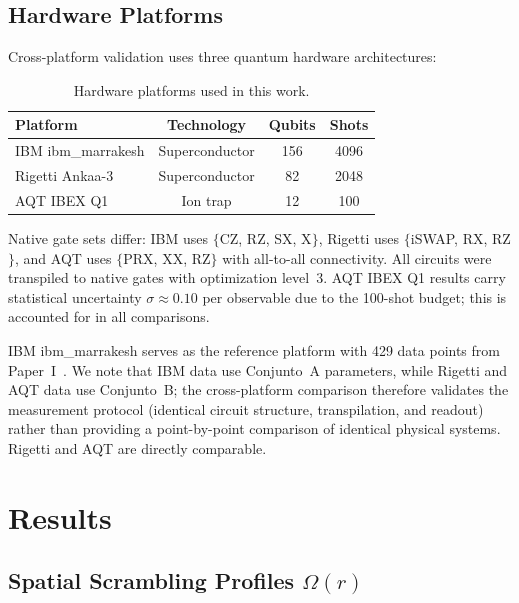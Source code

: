 \documentclass[twocolumn,showpacs,preprintnumbers,amsmath,amssymb,aps,prl]{revtex4-2}
\begin{document}
\subsection{Hardware Platforms}

Cross-platform validation uses three quantum hardware architectures:

\begin{table}[h]
\caption{Hardware platforms used in this work.}
\label{tab:hardware}
\begin{ruledtabular}
\begin{tabular}{lccc}
Platform & Technology & Qubits & Shots \\
\hline
IBM ibm\_marrakesh & Superconductor & 156 & 4096 \\
Rigetti Ankaa-3 & Superconductor & 82 & 2048 \\
AQT IBEX Q1 & Ion trap & 12 & 100 \\
\end{tabular}
\end{ruledtabular}
\end{table}

Native gate sets differ: IBM uses $\{$CZ, RZ, SX, X$\}$, Rigetti uses
$\{$iSWAP, RX, RZ$\}$, and AQT uses $\{$PRX, XX, RZ$\}$ with all-to-all
connectivity. All circuits were transpiled to native gates with optimization
level~3. AQT IBEX Q1 results carry statistical uncertainty $\sigma \approx 0.10$
per observable due to the 100-shot budget; this is accounted for in all
comparisons.

IBM ibm\_marrakesh serves as the reference platform with 429 data points from
Paper~I~\cite{PerezEugenio2026a}. We note that IBM data use Conjunto~A
parameters, while Rigetti and AQT data use Conjunto~B; the cross-platform
comparison therefore validates the measurement protocol (identical circuit
structure, transpilation, and readout) rather than providing a point-by-point
comparison of identical physical systems. Rigetti and AQT are directly comparable.

\section{Results}

\subsection{Spatial Scrambling Profiles $\Omega(r)$}
\end{document}
